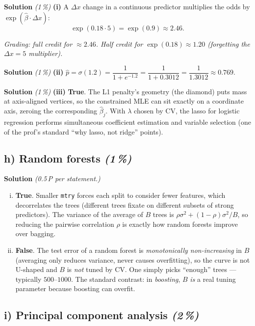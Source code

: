 \documentclass[11pt,a4paper]{article}
\newcommand{\subpoints}[1]{\textit{(#1\,\%)}}
\newcommand{\sol}{\noindent\textbf{Solution}}
\begin{document}
\sol{} \subpoints{1} \textbf{(i)} A $\Delta x$ change in a continuous predictor multiplies the odds
by $\exp(\hat\beta \cdot \Delta x)$:
$$\exp(0.18 \cdot 5) = \exp(0.9) \approx \boxed{2.46}.$$

\noindent\emph{Grading: full credit for $\approx 2.46$. Half credit for $\exp(0.18) \approx 1.20$
(forgetting the $\Delta x = 5$ multiplier).}

\medskip
\sol{} \subpoints{1} \textbf{(ii)} $\hat p = \sigma(1.2) = \dfrac{1}{1+e^{-1.2}}
   = \dfrac{1}{1+0.3012} = \dfrac{1}{1.3012} \approx \boxed{0.769}$.

\medskip
\sol{} \subpoints{1} \textbf{(iii)} \textbf{True}. The L1 penalty's geometry (the diamond) puts
mass at axis-aligned vertices, so the constrained MLE can sit exactly on a coordinate axis,
zeroing the corresponding $\hat\beta_j$. With $\lambda$ chosen by CV, the lasso for logistic
regression performs simultaneous coefficient estimation and variable selection (one of the prof's
standard ``why lasso, not ridge'' points).

\subsection*{h) Random forests \subpoints{1}}
\sol{} \emph{(0.5\,P per statement.)}
\begin{enumerate}[(i)]
  \item \textbf{True}. Smaller \texttt{mtry} forces each split to consider fewer features, which
        decorrelates the trees (different trees fixate on different subsets of strong predictors).
        The variance of the average of $B$ trees is $\rho\sigma^2 + (1-\rho)\sigma^2/B$, so reducing
        the pairwise correlation $\rho$ is exactly how random forests improve over bagging.
  \item \textbf{False}. The test error of a random forest is \emph{monotonically non-increasing}
        in $B$ (averaging only reduces variance, never causes overfitting), so the curve is not
        U-shaped and $B$ is \emph{not} tuned by CV. One simply picks ``enough'' trees --- typically
        $500$--$1000$. The standard contrast: in \emph{boosting}, $B$ \emph{is} a real tuning
        parameter because boosting can overfit.
\end{enumerate}

\subsection*{i) Principal component analysis \subpoints{2}}
\end{document}
